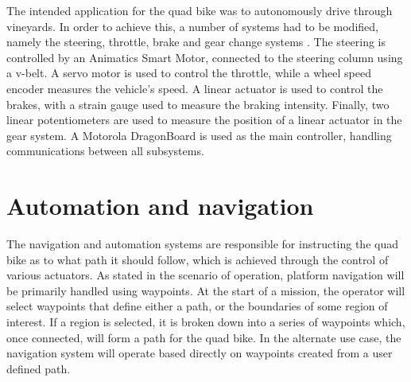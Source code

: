\documentclass[main.tex]{subfiles}
\begin{document}
The intended application for the quad bike was to autonomously drive through vineyards. In order to achieve this, a number of systems had to be modified, namely the steering, throttle, brake and gear change systems \parencite{scheiner2011}. The steering is controlled by an Animatics Smart Motor, connected to the steering column using a v-belt. A servo motor is used to control the throttle, while a wheel speed encoder measures the vehicle's speed. A linear actuator is used to control the brakes, with a strain gauge used to measure the braking intensity. Finally, two linear potentiometers are used to measure the position of a linear actuator in the gear system. A Motorola DragonBoard is used as the main controller, handling communications between all subsystems. 

\section{Automation and navigation}
The navigation and automation systems are responsible for instructing the quad bike as to what path it should follow, which is achieved through the control of various actuators. As stated in the scenario of operation, platform navigation will be primarily handled using waypoints. At the start of a mission, the operator will select waypoints that define either a path, or the boundaries of some region of interest. If a region is selected, it is broken down into a series of waypoints which, once connected, will form a path for the quad bike. In the alternate use case, the navigation system will operate based directly on waypoints created from a user defined path.
\end{document}
